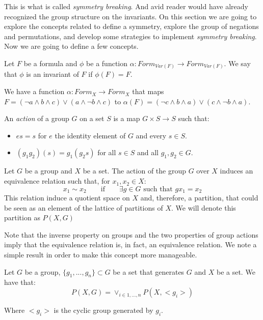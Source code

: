 This is what is called \emph{symmetry breaking}. And avid reader would have already recognized the group structure on the invariants.  On this section we are going to explore the concepts related to define a symmetry, explore the group of negations and permutations, and develop some strategies to implement \emph{symmetry breaking}.  Now we are going to define a few concepts.


\begin{definition}
Let $F$ be a formula and $\phi$ be a function $\alpha:Form_{Var(F)}\to Form_{Var(F)}$. We say that $\phi$ is an invariant of $F$ if $\phi(F) = F$.
\end{definition}

 We have a function $\alpha :Form_{X}\to Form_{X}$ that maps $F = (\neg a \land b  \land c) \lor (a \land \neg b \land c)$ to $\alpha(F) = (\neg c \land b  \land a) \lor (c \land \neg b \land a)$.\\



 \begin{definition}
  An \emph{action} of a group $G$ on a set $S$ is a map $G \times S \to S$ such that:
  \begin{itemize}
  \item $es = s$ for $e$ the identity element of $G$ and every $s\in S$.
  \item $(g_1g_2)(s) = g_1(g_2s)$ for all $s \in S$ and all $g_1,g_2\in G$.
    \end{itemize}
\end{definition}


\begin{definition}
  Let $G$ be a group and $X$ be a set. The action of the group $G$ over $X$ induces an equivalence relation such that, for $x_1,x_2 \in X$:
  $$x_1 \sim x_2 \qquad \text{if} \qquad  \exists g\in G\text{ such that } gx_1=x_2 $$
  This relation induce a quotient space on $X$ and, therefore, a partition, that could be seen as an element of the lattice of partitions of $X$. We will denote this partition as $P(X,G)$
\end{definition}

Note that the inverse property on groups and the two properties of group actions imply that the equivalence relation is, in fact, an equivalence relation. We note a simple result in order to make this concept more manageable.

\begin{proposition}
  Let $G$ be a group, $\{g_1,...,g_n\}\subset G$ be a set that generates $G$ and $X$ be a set. We have that:
  $$P(X,G) = \lor_{i\in 1,...,n} P(X,<g_i>) $$

  Where $<g_i>$ is the cyclic group generated by $g_i$.
\end{proposition}

